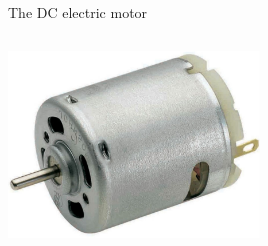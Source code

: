 \begin{frame}{The DC electric motor}
\begin{columns}[t]
\begin{column}{0.50\textwidth}
\begin{center}
        \includegraphics[width=0.50\textwidth]{./images/photos/electric_motor_dc_normal.jpg}\\
    \end{center}
  \end{column}
\end{columns}

\end{frame}

%
%
%

